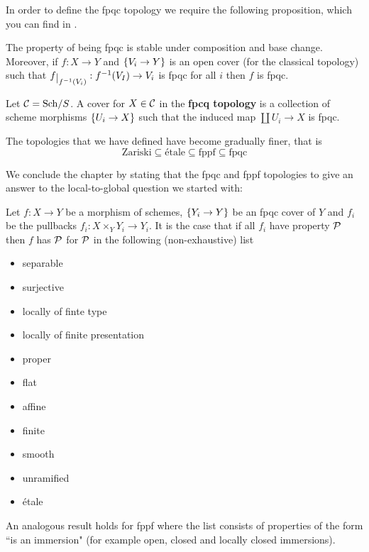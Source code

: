 In order to define the fpqc topology we require the following proposition, which you can find in \cite{vistoli2007notesgrothendiecktopologiesfibered}.

\begin{proposition}[]
The property of being fpqc is stable under composition and base change. Moreover, if $f:X\to Y$ and $\left\{{V_i\to Y}\right\}$ is an open cover (for the classical topology) such that $f\res{f\ii(V_i)}:f\ii(V_I)\to V_i$ is fpqc for all $i$ then $f$ is fpqc.
\end{proposition}

\begin{definition}
Let $\mathcal{C}=\mathrm{Sch}/S$. A cover for $X\in \mathcal{C}$ in the \textbf{fpcq topology} is a collection of scheme morphisms $\left\{{U_i\to X}\right\}$ such that the induced map $\coprod U_i\to X$ is fpqc.
\end{definition}



\begin{remark}
The topologies that we have defined have become gradually finer, that is
\[\text{Zariski}\subseteq \text{\'etale}\subseteq \text{fppf}\subseteq \text{fpqc}\]
\end{remark}

We conclude the chapter by stating that the fpqc and fppf topologies to give an answer to the local-to-global question we started with:

\begin{proposition}[]
Let $f:X\to Y$ be a morphism of schemes, $\left\{{Y_i\to Y}\right\}$ be an fpqc cover of $Y$ and $f_i$ be the pullbacks $f_i:X\times_YY_i\to Y_i$. It is the case that if all $f_i$ have property $\mathcal{P}$ then $f$ has $\mathcal{P}$ for $\mathcal{P}$ in the following (non-exhaustive) list
\begin{multicols}{2}
\begin{itemize}
\item separable
\item surjective
\item locally of finte type
\item locally of finite presentation
\item proper
\item flat
\item affine
\item finite
\item smooth
\item unramified
\item \'etale
\end{itemize}
\end{multicols}
\end{proposition}

\begin{remark}
An analogous result holds for fppf where the list consists of properties of the form ``is an immersion" (for example open, closed and locally closed immersions).
\end{remark}





















